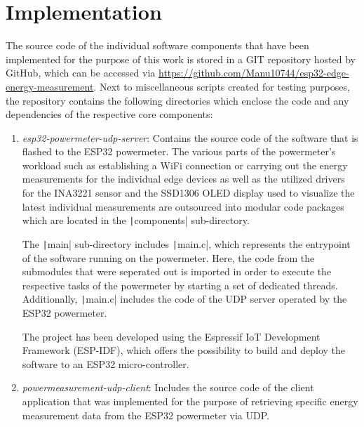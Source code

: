 \chapter{Implementation}\label{chapter:implementation}
The source code of the individual software components that have been implemented for the purpose of this work is stored in a GIT repository hosted by GitHub, which can be accessed via \url{https://github.com/Manu10744/esp32-edge-energy-measurement}. Next to miscellaneous scripts created for testing purposes, the repository contains the following directories which enclose the code and any dependencies of the respective core components:

\begin{enumerate}
    \item \textit{esp32-powermeter-udp-server}: Contains the source code of the software that is flashed to the ESP32 powermeter. The various parts of the powermeter's workload such as establishing a WiFi connection or carrying out the energy measurements for the individual edge devices as well as the utilized drivers for the INA3221 sensor and the SSD1306 OLED display used to visualize the latest individual measurements are outsourced into modular code packages which are located in the \texttt|components| sub-directory. 
    
    The \texttt|main| sub-directory includes \texttt|main.c|, which represents the entrypoint of the software running on the powermeter. Here, the code from the submodules that were seperated out is imported in order to execute the respective tasks of the powermeter by starting a set of dedicated threads. Additionally, \texttt|main.c| includes the code of the UDP server operated by the ESP32 powermeter.
    
    The project has been developed using the Espressif IoT Development Framework (ESP-IDF), which offers the possibility to build and deploy the software to an ESP32 micro-controller.
    
    \item \textit{powermeasurement-udp-client}: Includes the source code of the client application that was implemented for the purpose of retrieving specific energy measurement data from the ESP32 powermeter via UDP. 
    

\end{enumerate}
